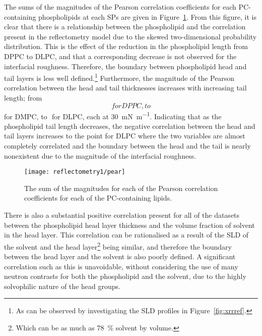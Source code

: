 The sums of the magnitudes of the Pearson correlation coefficients for each PC-containing phospholipids at each SPs are given in Figure~\ref{fig:pear}.
From this figure, it is clear that there is a relationship between the phospholipid and the correlation present in the reflectometry model due to the skewed two-dimensional probability distribution.
This is the effect of the reduction in the phospholipid length from DPPC to DLPC, and that a corresponding decrease is not observed for the interfacial roughness.
Therefore, the boundary between phospholipid head and tail layers is less well defined.\footnote{As can be observed by investigating the SLD profiles in Figure~\ref{fig:xrrref}.}
Furthermore, the magnitude of the Pearson correlation between the head and tail thicknesses increases with increasing tail length; from $$ for DPPC, to $$ for DMPC, to $$ for DLPC, each at \SI{30}{\milli\newton\per\meter}.
Indicating that as the phospholipid tail length decreases, the negative correlation between the head and tail layers increases to the point for DLPC where the two variables are almost completely correlated and the boundary between the head and the tail is nearly nonexistent due to the magnitude of the interfacial roughness.
%
\begin{figure}[t]
    \centering
    \texttt{[image: reflectometry1/pear]}
    \caption{The sum of the magnitudes for each of the Pearson correlation coefficients for each of the PC-containing lipids.}
    \label{fig:pear}
\end{figure}
%

There is also a substantial positive correlation present for all of the datasets between the phospholipid head layer thickness and the volume fraction of solvent in the head layer.
This correlation can be rationalised as a result of the SLD of the solvent and the head layer\footnote{Which can be as much as \SI{78}{\percent} solvent by volume.} being similar, and therefore the boundary between the head layer and the solvent is also poorly defined.
A significant correlation such as this is unavoidable, without considering the use of many neutron contrasts for both the phospholipid and the solvent, due to the highly solvophilic nature of the head groups.
